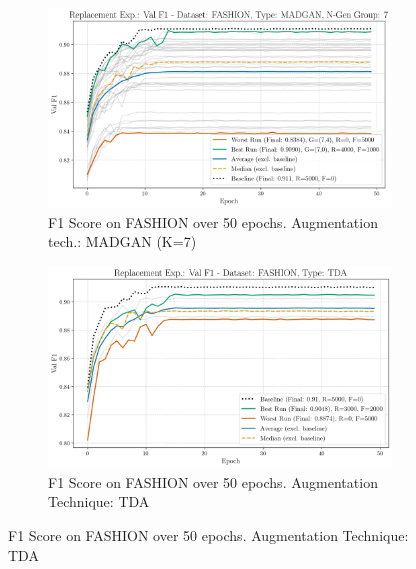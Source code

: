 \begin{figure}[H]
	\centering
	\begin{subfigure}{.85\textwidth}
		\includegraphics[width=\textwidth]{abb/strat_classifier_performance/FASHION_STRATIFIED_CLASSIFIERS_MADGAN_NEW/replacement_experiments/val_f1_score_MADGAN_FASHION_n_gen_7_all.png}
		\caption{F1 Score on FASHION over 50 epochs. Augmentation tech.: MADGAN (K=7)}
        \label{fig:res_replacement_fashion_tda_vs_madgan__madgan}
	\end{subfigure}
	\begin{subfigure}{.85\textwidth}
		\includegraphics[width=\textwidth]{abb/strat_classifier_performance/tda_fashion_mnist/replacement_experiments/val_f1_score_tda_fashion_mnist_fashion_all.png}
		\caption{F1 Score on FASHION over 50 epochs. Augmentation Technique: TDA}
        \label{fig:res_replacement_fashion_tda_vs_madgan__tda}
	\end{subfigure}
\end{figure}

